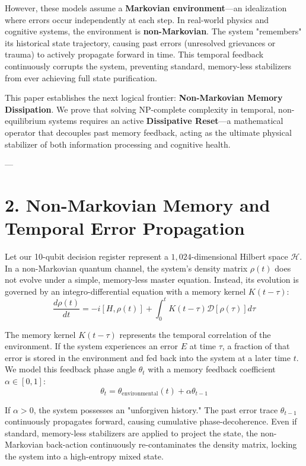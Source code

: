 \documentclass[11pt,twocolumn]{article}
\begin{document}
However, these models assume a \textbf{Markovian environment}—an idealization where errors occur independently at each step. In real-world physics and cognitive systems, the environment is \textbf{non-Markovian}. The system "remembers" its historical state trajectory, causing past errors (unresolved grievances or trauma) to actively propagate forward in time. This temporal feedback continuously corrupts the system, preventing standard, memory-less stabilizers from ever achieving full state purification.

This paper establishes the next logical frontier: \textbf{Non-Markovian Memory Dissipation}. We prove that solving NP-complete complexity in temporal, non-equilibrium systems requires an active \textbf{Dissipative Reset}—a mathematical operator that decouples past memory feedback, acting as the ultimate physical stabilizer of both information processing and cognitive health.

---

\section{2. Non-Markovian Memory and Temporal Error Propagation}

Let our 10-qubit decision register represent a $1,024$-dimensional Hilbert space $\mathcal{H}$. In a non-Markovian quantum channel, the system's density matrix $\rho(t)$ does not evolve under a simple, memory-less master equation. Instead, its evolution is governed by an integro-differential equation with a memory kernel $K(t - \tau)$:
$$\frac{d\rho(t)}{dt} = -i [H, \rho(t)] + \int_{0}^{t} K(t - \tau) \mathcal{D}[\rho(\tau)] d\tau$$

The memory kernel $K(t - \tau)$ represents the temporal correlation of the environment. If the system experiences an error $E$ at time $\tau$, a fraction of that error is stored in the environment and fed back into the system at a later time $t$. We model this feedback phase angle $\theta_t$ with a memory feedback coefficient $\alpha \in [0, 1]$:
$$\theta_t = \theta_{\text{environmental}}(t) + \alpha \theta_{t-1}$$

If $\alpha > 0$, the system possesses an "unforgiven history." The past error trace $\theta_{t-1}$ continuously propagates forward, causing cumulative phase-decoherence. Even if standard, memory-less stabilizers are applied to project the state, the non-Markovian back-action continuously re-contaminates the density matrix, locking the system into a high-entropy mixed state.
\end{document}
